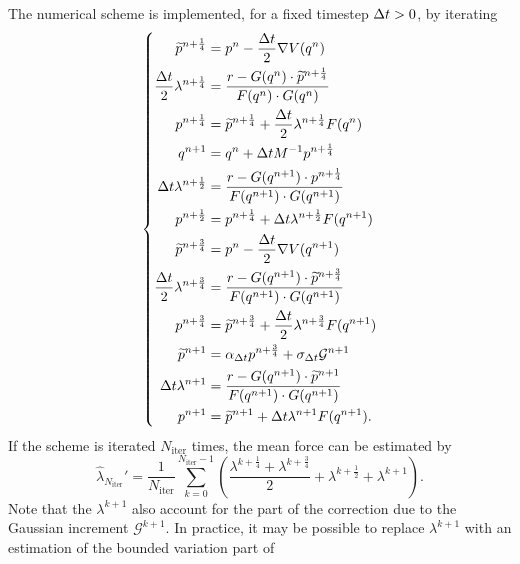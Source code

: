 \begin{example}
    The numerical scheme is implemented, for a fixed timestep ${\Delta t}>0$, by iterating
    \begin{equation}
        \label{eq:BABO_norton_scheme}
        \left\{
        \begin{aligned}
            \widetilde{p}^{n+\frac14} &= p^n -\frac{{\Delta t}}2\nabla V(q^n)\\
            \frac{{\Delta t}}2\lambda^{n+\frac14} &= \frac{r-G(q^n)\cdot \widetilde{p}^{n+\frac14}}{F(q^n)\cdot G(q^n)}\\
            p^{n+\frac14} &= \widetilde{p}^{n+\frac14}+\frac{{\Delta t}}2\lambda^{n+\frac14}F(q^n)\\
            q^{n+1} &= q^n +{\Delta t} M^{-1} p^{n+\frac14}\\
            {\Delta t}\lambda^{n+\frac12} &= \frac{r-G(q^{n+1})\cdot p^{n+\frac14}}{F(q^{n+1})\cdot G(q^{n+1})}\\
            p^{n+\frac12} &= p^{n+\frac14}+{\Delta t}\lambda^{n+\frac12}F(q^{n+1})\\
            \widetilde{p}^{n+\frac34} &= p^n -\frac{{\Delta t}}2\nabla V(q^{n+1})\\
            \frac{{\Delta t}}2\lambda^{n+\frac34} &= \frac{r-G(q^{n+1})\cdot \widetilde{p}^{n+\frac34}}{F(q^{n+1})\cdot G(q^{n+1})}\\
            p^{n+\frac34} &= \widetilde{p}^{n+\frac34}+\frac{{\Delta t}}2\lambda^{n+\frac34}F(q^{n+1})\\
            \widetilde{p}^{n+1} &= \alpha_{\Delta t} p^{n+\frac34} +\sigma_{\Delta t}\mathcal G^{n+1}\\
            {\Delta t}\lambda^{n+1} &= \frac{r-G(q^{n+1})\cdot \widetilde{p}^{n+1}}{F(q^{n+1})\cdot G(q^{n+1})}\\
            p^{n+1}&=\widetilde{p}^{n+1}+{\Delta t}\lambda^{n+1}F(q^{n+1}).
        \end{aligned}
        \right.
    \end{equation}
    If the scheme is iterated $N_{\mathrm{iter}}$ times, the mean force can be estimated by
    \begin{equation}
        \label{eq:norton_mean_force_estimator_general}
        \widehat{\lambda}_{N_\mathrm{iter}}'=\frac1{N_{\mathrm{iter}}}\sum_{k=0}^{N_{\mathrm{iter}}-1} \left(\frac{\lambda^{k+\frac14}+\lambda^{k+\frac34}}2+\lambda^{k+\frac12}+\lambda^{k+1}\right).
    \end{equation}
    Note that the $\lambda^{k+1}$ also account for the part of the correction due to the Gaussian increment $\mathcal G^{k+1}$. In practice, it may be possible to replace $\lambda^{k+1}$ with an estimation of the bounded variation part of 

\end{example}
